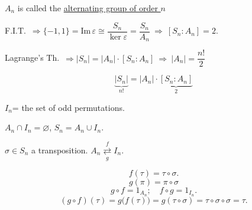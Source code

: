 \documentclass[12pt]{article}
\begin{document}
\noindent $A_n$ is called the \underline{alternating group of order $n$}

\bigskip
\noindent F.I.T.\ $\Rightarrow \{-1,1\} = \text{Im}\,\varepsilon \cong \dfrac{S_n}{\ker\varepsilon} = \dfrac{S_n}{A_n} \ \Rightarrow \ [S_n:A_n]=2.$

\bigskip
\noindent Lagrange's Th.\ $\Rightarrow |S_n| = |A_n|\cdot[S_n:A_n] \ \Rightarrow \ |A_n| = \dfrac{n!}{2}$

\[
\underbrace{|S_n|}_{n!} = |A_n|\cdot\underbrace{[S_n:A_n]}_{2}
\]

\bigskip
\noindent $I_n$= the set of odd permutations.

\noindent $A_n\cap I_n=\varnothing$, \quad $S_n = A_n\cup I_n$.

\bigskip
\noindent $\sigma\in S_n$ a transposition. \qquad $A_n \underset{g}{\overset{f}{\rightleftarrows}} I_n$.

\[
f(\tau) = \tau\circ\sigma.
\]
\[
g(\pi) = \pi\circ\sigma
\]
\[
g\circ f = 1_{A_n}; \quad f\circ g = 1_{I_n}.
\]
\[
(g\circ f)(\tau) = g\big(f(\tau)\big) = g(\tau\circ\sigma) = \tau\circ\sigma\circ\sigma = \tau.
\]
\end{document}
